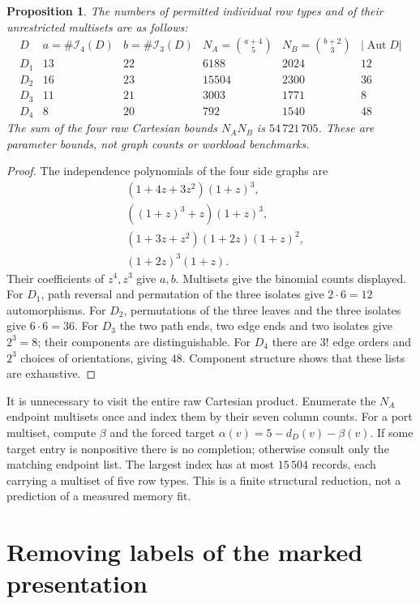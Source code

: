 \documentclass[11pt]{article}
\newtheorem{proposition}[theorem]{Proposition}
\begin{document}
\begin{proposition}\label{bounds}
The numbers of permitted individual row types and of their unrestricted
multisets are as follows:
\[
\begin{array}{c|rrrr|r}
 D&a=\#\mathcal I_4(D)&b=\#\mathcal I_3(D)
  &N_A=\binom{a+4}{5}&N_B=\binom{b+2}{3}&|\operatorname{Aut}D|\\\hline
 D_1&13&22&6188&2024&12\\
 D_2&16&23&15504&2300&36\\
 D_3&11&21&3003&1771&8\\
 D_4&8&20&792&1540&48
\end{array}
\]
The sum of the four raw Cartesian bounds $N_A N_B$ is $54\,721\,705$.
These are parameter bounds, not graph counts or workload benchmarks.
\end{proposition}
\begin{proof}
The independence polynomials of the four side graphs are
\[
\begin{split}
 &(1+4z+3z^2)(1+z)^3,\\
 &((1+z)^3+z)(1+z)^3,\\
 &(1+3z+z^2)(1+2z)(1+z)^2,\\
 &(1+2z)^3(1+z).
\end{split}
\]
Their coefficients of $z^4,z^3$ give $a,b$. Multisets give the binomial
counts displayed. For $D_1$, path reversal and permutation of the three
isolates give $2\cdot6=12$ automorphisms. For $D_2$, permutations of the
three leaves and the three isolates give $6\cdot6=36$. For $D_3$ the
two path ends, two edge ends and two isolates give $2^3=8$; their
components are distinguishable. For $D_4$ there are $3!$ edge orders and
$2^3$ choices of orientations, giving $48$. Component structure shows
that these lists are exhaustive.
\end{proof}

It is unnecessary to visit the entire raw Cartesian product. Enumerate
the $N_A$ endpoint multisets once and index them by their seven column
counts. For a port multiset, compute
$\beta$ and the forced target $\alpha(v)=5-d_D(v)-\beta(v)$.
If some target entry is nonpositive there is no completion; otherwise
consult only the matching endpoint list. The largest index has at most
$15\,504$ records, each carrying a multiset of five row types. This is a
finite structural reduction, not a prediction of a measured memory fit.

\section*{Removing labels of the marked presentation}
\end{document}
